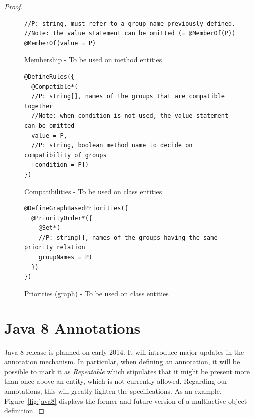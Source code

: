 \documentclass[11pt]{report}
\begin{document}
\begin{proof}
\newpage

\begin{figure}[t]
	\lstset{language=java, numbers=left, numberstyle=\tiny, stepnumber=1, numbersep=5pt, basicstyle=\footnotesize}
	\begin{lstlisting}[frame=single]
//P: string, must refer to a group name previously defined. 
//Note: the value statement can be omitted (= @MemberOf(P))
@MemberOf(value = P)
 	\end{lstlisting}
\caption{Membership - To be used on method entities}
\label{fig:memebership}
\end{figure}

\begin{figure}[t]
	\lstset{language=java, numbers=left, numberstyle=\tiny, stepnumber=1, numbersep=5pt, basicstyle=\footnotesize}
	\begin{lstlisting}[frame=single]
@DefineRules({
  @Compatible*(
  //P: string[], names of the groups that are compatible together
  //Note: when condition is not used, the value statement can be omitted
  value = P,
  //P: string, boolean method name to decide on compatibility of groups
  [condition = P])
})
 	\end{lstlisting}
\caption{Compatibilities - To be used on class entities}
\label{fig:compatibilities}
\end{figure}

\begin{figure}[t]
	\lstset{language=java, numbers=left, numberstyle=\tiny, stepnumber=1, numbersep=5pt, basicstyle=\footnotesize}
	\begin{lstlisting}[frame=single]
@DefineGraphBasedPriorities({
  @PriorityOrder*({
    @Set*(
    //P: string[], names of the groups having the same priority relation
    groupNames = P)
  })
})
 	\end{lstlisting}
\caption{Priorities (graph) - To be used on class entities}
\label{fig:priorities}
\end{figure}

\chapter{Java 8 Annotations}

Java 8 release is planned on early 2014. It will introduce major updates in the annotation mechanism. In particular, when defining an annotation, it will be possible to mark it as \emph{Repeatable} which stipulates that it might be present more than once above an entity, which is not currently allowed. Regarding our annotations, this will greatly lighten the specifications. As an example, Figure~\ref{fig:java8} displays the former and future version of a multiactive object definition.



\end{proof}
\end{document}
